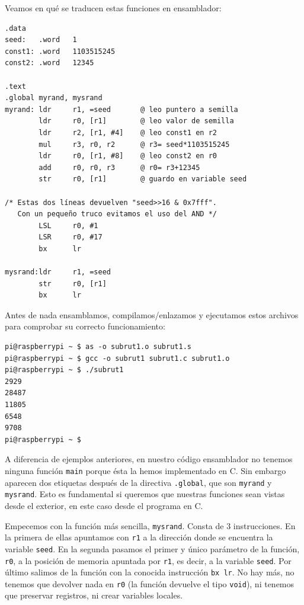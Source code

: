 Veamos en qué se traducen estas funciones en ensamblador:

\begin{lstlisting}[caption={Código del programa subrut1.s},label={lst:codigoPract3_2}]
.data
seed:   .word   1
const1: .word   1103515245
const2: .word   12345

.text
.global myrand, mysrand
myrand: ldr     r1, =seed       @ leo puntero a semilla
        ldr     r0, [r1]        @ leo valor de semilla
        ldr     r2, [r1, #4]    @ leo const1 en r2
        mul     r3, r0, r2      @ r3= seed*1103515245
        ldr     r0, [r1, #8]    @ leo const2 en r0
        add     r0, r0, r3      @ r0= r3+12345
        str     r0, [r1]        @ guardo en variable seed

/* Estas dos líneas devuelven "seed>>16 & 0x7fff".
   Con un pequeño truco evitamos el uso del AND */
        LSL     r0, #1
        LSR     r0, #17
        bx      lr

mysrand:ldr     r1, =seed
        str     r0, [r1]
        bx      lr
\end{lstlisting}

Antes de nada ensamblamos, compilamos/enlazamos y ejecutamos estos archivos para
comprobar su correcto funcionamiento:

\begin{lstlisting}
pi@raspberrypi ~ $ as -o subrut1.o subrut1.s
pi@raspberrypi ~ $ gcc -o subrut1 subrut1.c subrut1.o
pi@raspberrypi ~ $ ./subrut1
2929
28487
11805
6548
9708
pi@raspberrypi ~ $
\end{lstlisting}

A diferencia de ejemplos anteriores, en nuestro código ensamblador no tenemos
ninguna función {\tt main} porque ésta la hemos implementado en C. Sin embargo
aparecen dos etiquetas después de la directiva {\tt .global}, que son
{\tt myrand} y {\tt mysrand}. Esto es fundamental si queremos que nuestras
funciones sean vistas desde el exterior, en este caso desde el programa en C.

Empecemos con la función más sencilla, {\tt mysrand}. Consta de 3 instrucciones.
En la primera de ellas apuntamos con {\tt r1} a la dirección donde se encuentra
la variable {\tt seed}. En la segunda pasamos el primer y único parámetro de la
función, {\tt r0}, a la posición de memoria apuntada por {\tt r1}, es decir, a
la variable {\tt seed}. Por último salimos de la función con la conocida
instrucción {\tt bx lr}. No hay más, no tenemos que devolver nada en {\tt r0}
(la función devuelve el tipo {\tt void}), ni tenemos que preservar registros,
ni crear variables locales.

